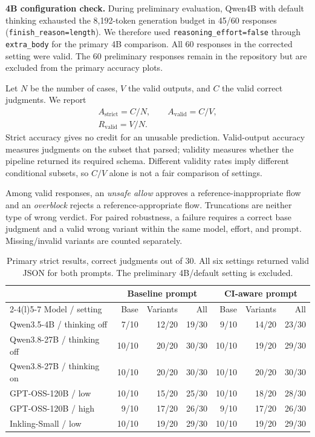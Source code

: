 \documentclass[10pt,twocolumn]{article}
\makeatletter
\renewcommand\subsection{\@startsection{subsection}{2}{0pt}{6pt}{2pt}{\normalfont\normalsize\bfseries\raggedright}}
\makeatother
\begin{document}
\textbf{4B configuration check.} During preliminary evaluation, Qwen4B
with default thinking exhausted the 8,192-token generation budget in 45/60
responses (\texttt{finish\_reason=length}). We therefore used
\texttt{reasoning\_effort=false} through \texttt{extra\_body} for
the primary 4B comparison. All 60 responses in the corrected setting
were valid. The 60 preliminary responses remain in the repository but
are excluded from the primary accuracy plots.

\subsection{Three complementary measures}
Let $N$ be the number of cases, $V$ the valid outputs, and $C$ the valid correct
judgments. We report
\[
\begin{gathered}
A_{\mathrm{strict}}=C/N,\qquad A_{\mathrm{valid}}=C/V,\\[2pt]
R_{\mathrm{valid}}=V/N.
\end{gathered}
\]
Strict accuracy gives no credit for an unusable prediction. Valid-output accuracy
measures judgments on the subset that parsed; validity measures whether the
pipeline returned its required schema. Different validity rates imply different
conditional subsets, so $C/V$ alone is not a fair comparison of settings.

Among valid responses, an \emph{unsafe allow} approves a reference-inappropriate
flow and an \emph{overblock} rejects a reference-appropriate flow. Truncations
are neither type of wrong verdict. For paired robustness, a failure requires a
correct base judgment and a valid wrong variant within the same model, effort,
and prompt. Missing/invalid variants are counted separately.

\begin{table}[t]
\centering\small
\caption{Primary strict results, correct judgments out of 30. All six settings
returned valid JSON for both prompts. The preliminary 4B/default setting is excluded.}
\label{tab:accuracy}
\begin{tabular}{@{}lrrrrrr@{}}
\toprule
& \multicolumn{3}{c}{Baseline prompt} & \multicolumn{3}{c}{CI-aware prompt} \\
\cmidrule(lr){2-4}\cmidrule(l){5-7}
Model / setting & Base & Variants & All & Base & Variants & All \\
\midrule
Qwen3.5-4B / thinking off & 7/10 & 12/20 & 19/30 & 9/10 & 14/20 & 23/30 \\
Qwen3.8-27B / thinking off & 10/10 & 20/20 & 30/30 & 10/10 & 19/20 & 29/30 \\
Qwen3.8-27B / thinking on & 10/10 & 20/20 & 30/30 & 10/10 & 20/20 & 30/30 \\
GPT-OSS-120B / low & 10/10 & 15/20 & 25/30 & 10/10 & 18/20 & 28/30 \\
GPT-OSS-120B / high & 9/10 & 17/20 & 26/30 & 9/10 & 17/20 & 26/30 \\
Inkling-Small / low & 10/10 & 19/20 & 29/30 & 10/10 & 19/20 & 29/30 \\
\bottomrule
\end{tabular}
\end{table}
\end{document}
